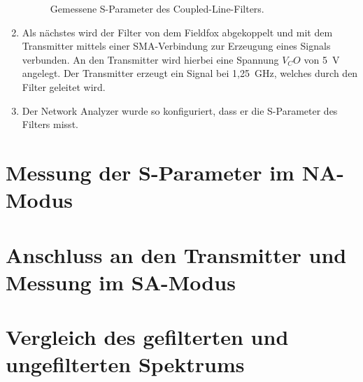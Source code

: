 \begin{enumerate}
\begin{figure}[H]
        \caption{Gemessene S-Parameter des Coupled-Line-Filters.}
        \label{fig:fieldfox_s_parameter}
    \end{figure}
    \item Als nächstes wird der Filter von dem Fieldfox abgekoppelt und mit dem Transmitter mittels einer SMA-Verbindung zur Erzeugung eines Signals verbunden. An den Transmitter wird hierbei eine Spannung $V_CO$ von 5~V angelegt.
    Der Transmitter erzeugt ein Signal bei 1,25~GHz, welches durch den Filter geleitet wird.
    \item Der Network Analyzer wurde so konfiguriert, dass er die S-Parameter des Filters misst.
\end{enumerate}
\section{Messung der S-Parameter im NA-Modus}
\section{Anschluss an den Transmitter und Messung im SA-Modus}
\section{Vergleich des gefilterten und ungefilterten Spektrums}
